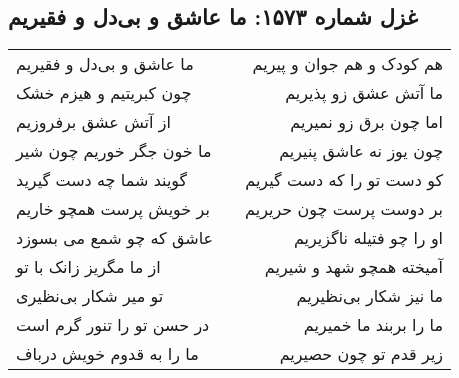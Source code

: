 \begin{center}
\section*{غزل شماره ۱۵۷۳: ما عاشق و بی‌دل و فقیریم}
\label{sec:1573}
\begin{longtable}{l p{0.5cm} r}
ما عاشق و بی‌دل و فقیریم
&&
هم کودک و هم جوان و پیریم
\\
چون کبریتیم و هیزم خشک
&&
ما آتش عشق زو پذیریم
\\
از آتش عشق برفروزیم
&&
اما چون برق زو نمیریم
\\
ما خون جگر خوریم چون شیر
&&
چون یوز نه عاشق پنیریم
\\
گویند شما چه دست گیرید
&&
کو دست تو را که دست گیریم
\\
بر خویش پرست همچو خاریم
&&
بر دوست پرست چون حریریم
\\
عاشق که چو شمع می بسوزد
&&
او را چو فتیله ناگزیریم
\\
از ما مگریز زانک با تو
&&
آمیخته همچو شهد و شیریم
\\
تو میر شکار بی‌نظیری
&&
ما نیز شکار بی‌نظیریم
\\
در حسن تو را تنور گرم است
&&
ما را بربند ما خمیریم
\\
ما را به قدوم خویش درباف
&&
زیر قدم تو چون حصیریم
\\
\end{longtable}
\end{center}
